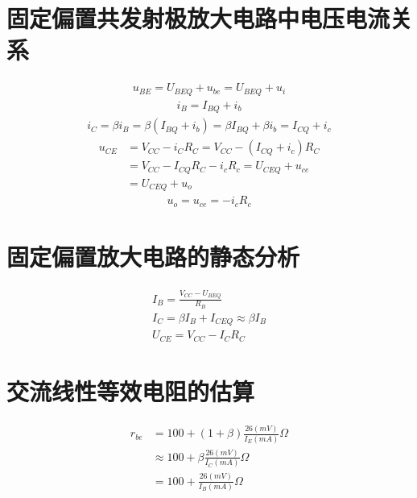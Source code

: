 \documentclass{ctexart}
\begin{document}
\section{固定偏置共发射极放大电路中电压电流关系}
\begin{gather*}
u_{BE} = U_{BEQ} + u_{be} = U_{BEQ} + u_i
\end{gather*}
\begin{gather*}
i_B = I_{BQ} + i_b
\end{gather*}
\begin{gather*}
i_C = \beta i_B = \beta(I_{BQ} + i_b) = \beta I_{BQ} + \beta i_b = I_{CQ} + i_c
\end{gather*}
\begin{align*}
u_{CE} &= V_{CC} - i_{C}R_{C} = V_{CC} - (I_{CQ} + i_c)R_C \\
       &= V_{CC} - I_{CQ}R_{C} - i_{c}R_c = U_{CEQ} + u_{ce} \\
       &= U_{CEQ} + u_o
\end{align*}
\begin{gather*}
u_o = u_{ce} = -i_{c}R_{c}
\end{gather*}

\section{固定偏置放大电路的静态分析}
\begin{gather*}
I_B = \frac{V_{CC} - U_{BEQ}}{R_B} \\
I_C = \beta I_B + I_{CEQ} \approx \beta I_B \\
U_{CE} = V_{CC} - I_{C}R_{C}
\end{gather*}

\section{交流线性等效电阻的估算}
\begin{align*}
r_{be} &= 100 + (1 + \beta)\frac{26(mV)}{I_E(mA)} \Omega \\
       &\approx 100 + \beta\frac{26(mV)}{I_C(mA)} \Omega \\
       &= 100 + \frac{26(mV)}{I_B(mA)} \Omega
\end{align*}
\end{document}
